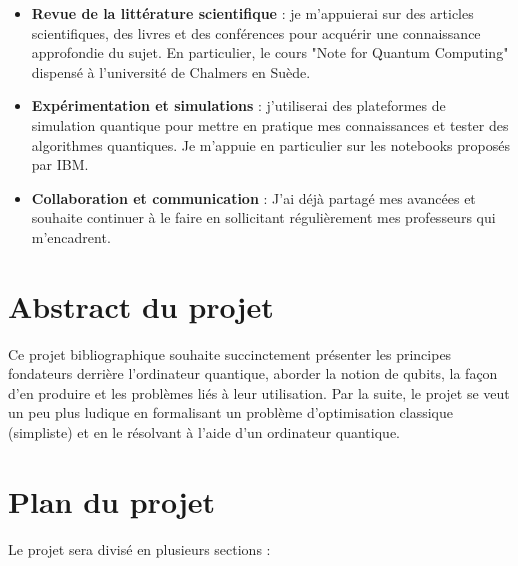 \documentclass[12pt]{article}
\begin{document}
\begin{itemize}
    \item \textbf{Revue de la littérature scientifique} : je m'appuierai sur des articles scientifiques, des livres et des conférences pour acquérir une connaissance approfondie du sujet. En particulier, le cours "Note for Quantum Computing" dispensé à l'université de Chalmers en Suède.
    \item \textbf{Expérimentation et simulations} : j'utiliserai des plateformes de simulation quantique pour mettre en pratique mes connaissances et tester des algorithmes quantiques. Je m'appuie en particulier sur les notebooks proposés par IBM.
    \item \textbf{Collaboration et communication} : J'ai déjà partagé mes avancées et souhaite continuer à le faire en sollicitant régulièrement mes professeurs qui m'encadrent.
\end{itemize}

\section*{Abstract du projet}

Ce projet bibliographique souhaite succinctement présenter les principes fondateurs derrière l'ordinateur quantique, aborder la notion de qubits, la façon d'en produire et les problèmes liés à leur utilisation. Par la suite, le projet se veut un peu plus ludique en formalisant un problème d'optimisation classique (simpliste) et en le résolvant à l'aide d'un ordinateur quantique.

\section{Plan du projet}

Le projet sera divisé en plusieurs sections :
\end{document}
